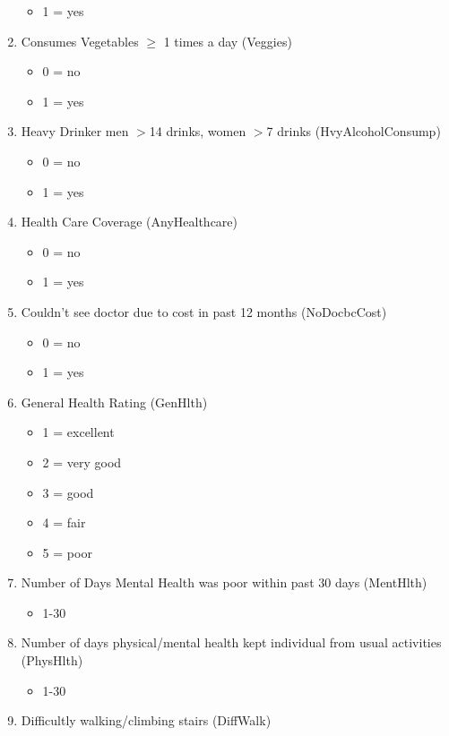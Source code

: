 \documentclass[journal]{IEEEtran}
\begin{document}
\begin{enumerate}
\begin{itemize}
    \item 1 = yes
    \end{itemize}
\item  Consumes Vegetables $\geq$ 1 times a day (Veggies)
\begin{itemize}
    \item 0 = no
    \item 1 = yes
    \end{itemize}
\item  Heavy Drinker men $>$14 drinks, women $>$7 drinks (HvyAlcoholConsump) 
\begin{itemize}
    \item 0 = no
    \item 1 = yes
    \end{itemize}
\item  Health Care Coverage (AnyHealthcare)
\begin{itemize}
    \item 0 = no
    \item 1 = yes
    \end{itemize}
\item  Couldn't see doctor due to cost in past 12 months (NoDocbcCost)
\begin{itemize}
    \item 0 = no
    \item 1 = yes
    \end{itemize}
\item  General Health Rating (GenHlth)
\begin{itemize}
    \item 1 = excellent
    \item 2 = very good 
    \item 3 = good 
    \item 4 = fair 
    \item 5 = poor 
    \end{itemize}
\vspace{10px}
\item  Number of Days Mental Health was poor within past 30 days (MentHlth)
\begin{itemize}
    \item 1-30
    \end{itemize}
\item  Number of days physical/mental health kept individual from usual activities (PhysHlth)
\begin{itemize}
    \item 1-30
    \end{itemize}
\item  Difficultly walking/climbing stairs (DiffWalk)

\end{enumerate}
\end{document}
